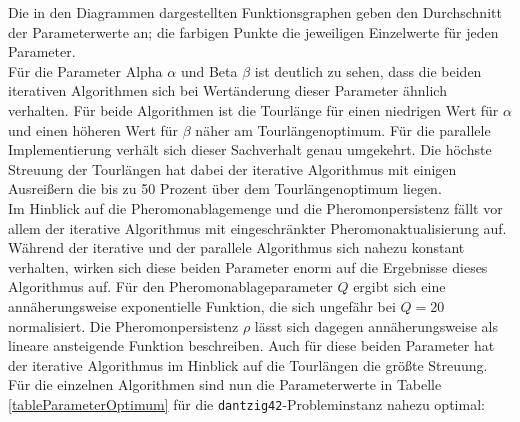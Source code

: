 \documentclass[doktyp=barbeit, sprache=german]{TUBAFarbeiten}
\begin{document}
Die in den Diagrammen dargestellten Funktionsgraphen geben den Durchschnitt der Parameterwerte an; die farbigen Punkte die jeweiligen Einzelwerte für jeden Parameter.
\\Für die Parameter Alpha $\alpha$ und Beta $\beta$ ist deutlich zu sehen, dass die beiden iterativen Algorithmen sich bei Wertänderung dieser Parameter ähnlich verhalten. Für beide Algorithmen ist die Tourlänge für einen niedrigen Wert für $\alpha$ und einen höheren Wert für $\beta$ näher am Tourlängenoptimum. Für die parallele Implementierung verhält sich dieser Sachverhalt genau umgekehrt. Die höchste Streuung der Tourlängen hat dabei der iterative Algorithmus mit einigen Ausreißern die bis zu 50 Prozent über dem Tourlängenoptimum liegen.
\\Im Hinblick auf die Pheromonablagemenge und die Pheromonpersistenz fällt vor allem der iterative Algorithmus mit eingeschränkter Pheromonaktualisierung auf. Während der iterative und der parallele Algorithmus sich nahezu konstant verhalten, wirken sich diese beiden Parameter enorm auf die Ergebnisse dieses Algorithmus auf. Für den Pheromonablageparameter $Q$ ergibt sich eine annäherungsweise exponentielle Funktion, die sich ungefähr bei $Q = 20$ normalisiert. Die Pheromonpersistenz $\rho$ lässt sich dagegen annäherungsweise als lineare ansteigende Funktion beschreiben. Auch für diese beiden Parameter hat der iterative Algorithmus im Hinblick auf die Tourlängen die größte Streuung.
\\Für die einzelnen Algorithmen sind nun die Parameterwerte in Tabelle \ref{tableParameterOptimum} für die \texttt{dantzig42}-Probleminstanz nahezu optimal:
\begin{table}[]
\centering
{}
\captionsetup{justification=centering}
\caption[Übersicht der Parameterwerte, die bei jedem Algorithmus der Tourkonstruktion zu den besten Ergebnissen im Hinblick auf eine kurze Tourlänge führen]{Übersicht der Parameterwerte, die bei dem jeweiligen Algorithmus zu den besten Ergebnissen im Hinblick auf eine kurze Tourlänge führen}
\label{tableParameterOptimum}
\end{table}
\end{document}
